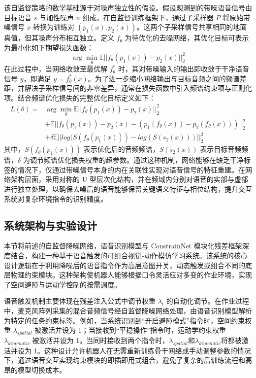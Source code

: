 该自监督策略的数学基础源于对噪声独立性的假设。假设观测到的带噪语音信号由目标语音 $s$ 与加性噪声 $n$ 组成。在自监督训练框架下，通过子采样器 $P$ 将原始带噪信号 $x$ 转换为训练对 $(p_{1}(x), p_{2}(x))$。这两个子采样信号共享相同的地面真值，但其噪声分布相互独立。定义 $f_{\theta}$ 为待优化的去噪网络，其优化目标可表示为最小化如下期望损失函数：
\begin{equation}
\arg \min_{\theta} \mathbb{E}||f_{\theta}(p_{1}(x))-p_{2}(x)||_{2}^{2}
\end{equation}
在此过程中，当网络收敛至最优解 $f_{\theta}^{*}$ 时，其对带噪输入的输出即收敛于干净语音信号 $y$，即满足 $y=f_{\theta}^{*}(x)$。为了进一步缩小网络输出与目标音频之间的频谱差距，并解决子采样信号间的非零差异，通常在损失函数中引入频谱约束项与正则化项。结合频谱优化损失的完整优化目标定义如下：
\begin{equation}
\begin{aligned}
L(\theta) = & \arg \min_{\theta} \mathbb{E}||f_{\theta}(p_{1}(x))-p_{2}(x)||_{2}^{2} \\
& + \mathbb{E}||f_{\theta}(p_{1}(x))-p_{2}(x)-(p_{1}(f_{\theta}(x))-p_{2}(f_{\theta}(x)))||_{2}^{2} \\
& + \delta \mathbb{E}||log(S(f_{\theta}(p_{1}(x)))-log(S(s_{2}(x)))||_{2}^{2}
\end{aligned}
\end{equation}
其中，$S(f_{\theta}(p_{1}(x)))$ 表示优化后的音频频谱，$S(s_{2}(x))$ 表示目标音频频谱，$\delta$ 为调节频谱优化损失权重的超参数。通过这种机制，网络能够在缺乏干净标签的情况下，仅通过带噪信号本身的内在关联性实现对语音信号的特征重建。在网络架构层面，采用对称的 U 型层次化结构，并在频域内分别对语音的实部与虚部进行独立处理，以确保去噪后的语音能够保留关键语义特征与相位结构，提升交互系统对复杂环境指令的识别精度。

\subsection{系统架构与实验设计}

本节将前述的自监督降噪网络，语音识别模型与 ConstrainNet 模块化残差框架深度结合，构建一种基于语音触发的可组合视觉-动作模仿学习系统。该系统的核心设计逻辑在于利用降噪后的语音指令作为高层意图开关，动态触发或组合不同的底层物理约束模块。这种架构使机器人能够根据口令灵活应对多变的作业环境，实现了空间避障与运动学控制的按需调度。

语音触发机制主要体现在残差注入公式中调节权重 $\lambda_{i}$ 的自动化调节。在作业过程中，麦克风阵列采集的混合音频信号经自监督降噪网络处理，由语音识别模型解析为特定的任务约束标签。例如，当系统识别到“开启避障模式”指令时，空间约束权重 $\lambda_{spatial}$ 被激活并设为 1；当接收到“平稳操作”指令时，运动学约束权重 $\lambda_{kinematic}$ 被激活并设为 1。当同时接收到两个指令时，$\lambda_{spatial}$和$\lambda_{kinematic}$将都被激活并设为 1。这种设计允许机器人在无需重新训练骨干网络或手动调整参数的情况下，通过语音交互实现约束模块的即插即用式组合，避免了复杂的后训练流程和高昂的模型切换成本。

